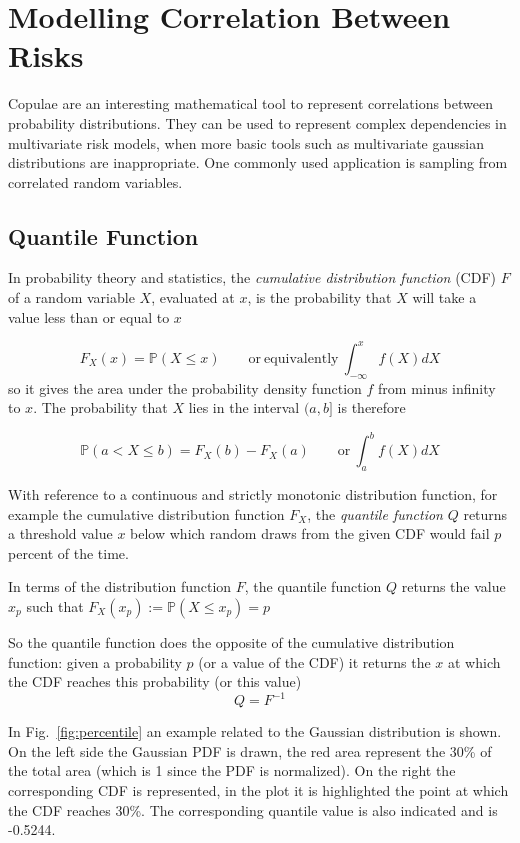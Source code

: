 \chapter{Modelling Correlation Between Risks}

Copulae are an interesting mathematical tool to represent correlations between probability distributions. They can be used to represent complex dependencies in multivariate risk models, when more basic tools such as multivariate gaussian distributions are inappropriate. One commonly used application is sampling from correlated random variables.

\section{Quantile Function}\label{quantile-function}

In probability theory and statistics, the \emph{cumulative distribution function} (CDF) \(F\) of a random variable \(X\), evaluated at \(x\), is the probability that \(X\) will take a value less than or equal to \(x\)

\[F_X(x) = \mathbb{P}(X \le x)\qquad\mathrm{or~equivalently}~\int_{-\infty}^{x}{f(X)dX}\]
so it gives the area under the probability density function \(f\) from
minus infinity to \(x\).
The probability that \(X\) lies in the interval \((a,b]\) is therefore

\[\mathbb{P}(a\lt X \le b)=F_{X}(b)-F_{X}(a)\qquad\mathrm{or}~\int_a^b{f(X)dX}\]

With reference to a continuous and strictly monotonic distribution
function, for example the cumulative distribution function \(F_X\), the
\emph{quantile function} \(Q\) returns a threshold value \(x\) below
which random draws from the given CDF would fail \(p\) percent of the
time.

In terms of the distribution function \(F\), the quantile function \(Q\)
returns the value \(x_p\) such that $F_{X}(x_p):=\mathbb{P}(X\le x_p)=p$

So the quantile function does the opposite of the cumulative
distribution function: given a probability \(p\) (or a value of the CDF)
it returns the \(x\) at which the CDF reaches this probability (or this
value) \[Q=F^{-1}\]

In Fig.~\ref{fig:percentile} an example related to the
Gaussian distribution is shown. On the left side the Gaussian PDF is drawn,
the red area represent the 30\% of the total area (which is 1 since the
PDF is normalized). On the right the corresponding CDF is represented,
in the plot it is highlighted the point at which the CDF reaches
30\%. The corresponding quantile value is also indicated and is -0.5244.

